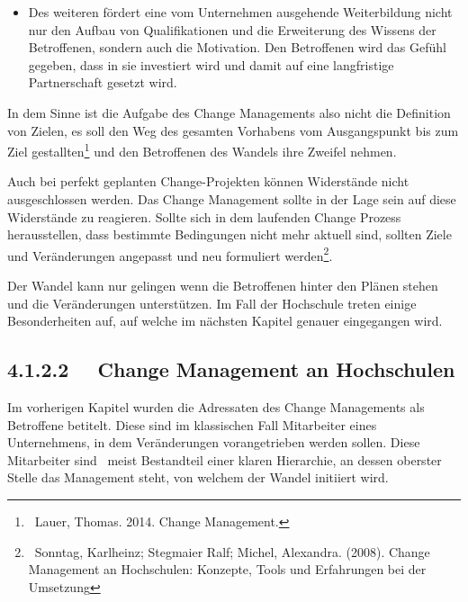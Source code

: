 \documentclass{article}
\begin{document}
\bigskip


\bigskip

\begin{itemize}
\item[] Des weiteren fördert eine vom Unternehmen ausgehende Weiterbildung nicht nur den Aufbau von Qualifikationen und
die Erweiterung des Wissens der Betroffenen, sondern auch die Motivation. Den Betroffenen wird das Gefühl gegeben, dass
in sie investiert wird und damit auf eine langfristige Partnerschaft gesetzt wird.
\end{itemize}

\bigskip

In dem Sinne ist die Aufgabe des Change Managements also nicht die Definition von Zielen, es soll den Weg des gesamten
Vorhabens vom Ausgangspunkt bis zum Ziel gestallten\footnote{\ Lauer, Thomas. 2014. Change Management.} und den
Betroffenen des Wandels ihre Zweifel nehmen. 


\bigskip

Auch bei perfekt geplanten Change-Projekten können Widerstände nicht ausgeschlossen werden. Das Change Management sollte
in der Lage sein auf diese Widerstände zu reagieren. Sollte sich in dem laufenden Change Prozess herausstellen, dass
bestimmte Bedingungen nicht mehr aktuell sind, sollten Ziele und Veränderungen angepasst und neu formuliert
werden\footnote{\ Sonntag, Karlheinz; Stegmaier Ralf; Michel, Alexandra. (2008). Change Management an Hochschulen:
Konzepte, Tools und Erfahrungen bei der Umsetzung}. \ 


\bigskip

Der Wandel kann nur gelingen wenn die Betroffenen hinter den Plänen stehen und die Veränderungen unterstützen. Im Fall
der Hochschule treten einige Besonderheiten auf, auf welche im nächsten Kapitel genauer eingegangen wird. \ 

\subsection[4.1.2.2 \ \ Change Management an Hochschulen]{4.1.2.2 \ \ Change Management an Hochschulen}
Im vorherigen Kapitel wurden die Adressaten des Change Managements als Betroffene betitelt. Diese sind im klassischen
Fall Mitarbeiter eines Unternehmens, in dem Veränderungen vorangetrieben werden sollen. Diese Mitarbeiter sind \ meist
Bestandteil einer klaren Hierarchie, an dessen oberster Stelle das Management steht, von welchem der Wandel initiiert
wird. 


\bigskip
\end{document}
